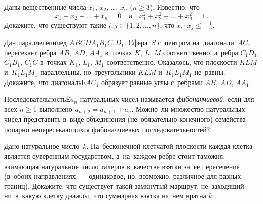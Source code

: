 


\begin{problems}

\item
Даны вещественные числа $x_{1}$, $x_{2}$, \ldots, $x_{n}$ ($n \geq 3$).
Известно, что \[
    x_{1} + x_{2} + \ldots + x_{n} = 0
\quad\text{и}\quad
    x_{1}^2 + x_{2}^2 + \ldots + x_{n}^2 = 1
\, . \]
Докажите, что существуют такие $i, j \in \{1, 2, \ldots,  n\}$, что
$x_{i} \cdot x_{j} \leq -\frac{1}{n}$.

\item
Дан параллелепипед $ABCDA_{1}B_{1}C_{1}D_{1}$.
Сфера~$S$ с~центром на~диагонали~$AC_{1}$ пересекает
ребра $AB$, $AD$, $AA_{1}$ в~точках $K$, $L$, $M$ соответственно,
а~ребра $C_{1}D_{1}$, $C_{1}B_{1}$, $C_{1}C$ в~точках $K_{1}$, $L_{1}$, $M_{1}$
соответственно.
Оказалось, что плоскости $KLM$ и~$K_{1}L_{1}M_{1}$ параллельны,
но~треугольники $KLM$ и~$K_{1}L_{1}M_{1}$ не~равны.
Докажите, что диагональЁ$AC_{1}$ образует равные углы с~ребрами
$AB$, $AD$, $AA_{1}$.

\item
ПоследовательностьЁ$a_n$ натуральных чисел называется \emph{фибоначчиевой,}
если для всех $n \geq 1$ выполнено $a_{n + 2} = a_{n + 1} + a_n$.
Можно~ли множество натуральных чисел представить в~виде объединения
(не~обязательно конечного) семейства попарно непересекающихся фибоначчиевых
последовательностей?

\item
Дано натуральное число~$k$.
На~бесконечной клетчатой плоскости каждая клетка является суверенным
государством, а~на~каждом ребре стоит таможня, взимающая натуральное число
талеров в~качестве взятки за~ее пересечение (в~обоих направлениях~---
одинаковое, но, возможно, различное для разных границ).
Докажите, что существует такой замкнутый маршрут, не~заходящий ни~в~какую
клетку дважды, что суммарная взятка на~нем кратна $k$.

\end{problems}

